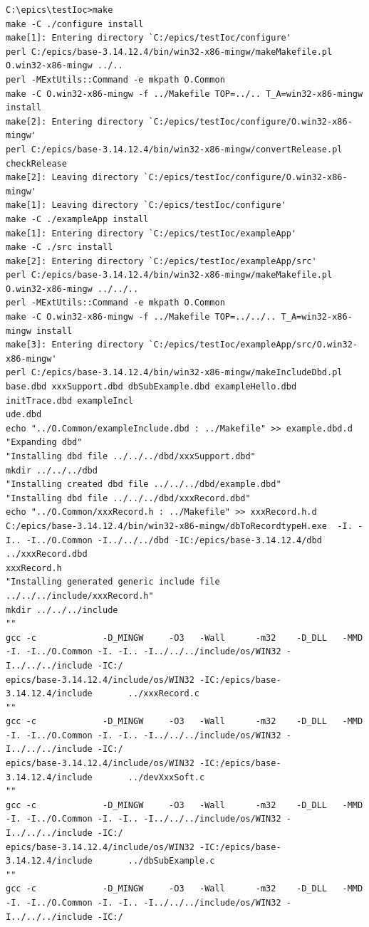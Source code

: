 \documentclass[11pt
  , a4paper
  , article
  , oneside
]{memoir}
\begin{document}
\begin{lstlisting}[style=termstyle]
C:\epics\testIoc>make
make -C ./configure install
make[1]: Entering directory `C:/epics/testIoc/configure'
perl C:/epics/base-3.14.12.4/bin/win32-x86-mingw/makeMakefile.pl O.win32-x86-mingw ../..
perl -MExtUtils::Command -e mkpath O.Common
make -C O.win32-x86-mingw -f ../Makefile TOP=../.. T_A=win32-x86-mingw install
make[2]: Entering directory `C:/epics/testIoc/configure/O.win32-x86-mingw'
perl C:/epics/base-3.14.12.4/bin/win32-x86-mingw/convertRelease.pl checkRelease
make[2]: Leaving directory `C:/epics/testIoc/configure/O.win32-x86-mingw'
make[1]: Leaving directory `C:/epics/testIoc/configure'
make -C ./exampleApp install
make[1]: Entering directory `C:/epics/testIoc/exampleApp'
make -C ./src install
make[2]: Entering directory `C:/epics/testIoc/exampleApp/src'
perl C:/epics/base-3.14.12.4/bin/win32-x86-mingw/makeMakefile.pl O.win32-x86-mingw ../../..
perl -MExtUtils::Command -e mkpath O.Common
make -C O.win32-x86-mingw -f ../Makefile TOP=../../.. T_A=win32-x86-mingw install
make[3]: Entering directory `C:/epics/testIoc/exampleApp/src/O.win32-x86-mingw'
perl C:/epics/base-3.14.12.4/bin/win32-x86-mingw/makeIncludeDbd.pl base.dbd xxxSupport.dbd dbSubExample.dbd exampleHello.dbd initTrace.dbd exampleIncl
ude.dbd
echo "../O.Common/exampleInclude.dbd : ../Makefile" >> example.dbd.d
"Expanding dbd"
"Installing dbd file ../../../dbd/xxxSupport.dbd"
mkdir ../../../dbd
"Installing created dbd file ../../../dbd/example.dbd"
"Installing dbd file ../../../dbd/xxxRecord.dbd"
echo "../O.Common/xxxRecord.h : ../Makefile" >> xxxRecord.h.d
C:/epics/base-3.14.12.4/bin/win32-x86-mingw/dbToRecordtypeH.exe  -I. -I.. -I../O.Common -I../../../dbd -IC:/epics/base-3.14.12.4/dbd ../xxxRecord.dbd
xxxRecord.h
"Installing generated generic include file ../../../include/xxxRecord.h"
mkdir ../../../include
""
gcc -c             -D_MINGW     -O3   -Wall      -m32    -D_DLL   -MMD -I. -I../O.Common -I. -I.. -I../../../include/os/WIN32 -I../../../include -IC:/
epics/base-3.14.12.4/include/os/WIN32 -IC:/epics/base-3.14.12.4/include       ../xxxRecord.c
""
gcc -c             -D_MINGW     -O3   -Wall      -m32    -D_DLL   -MMD -I. -I../O.Common -I. -I.. -I../../../include/os/WIN32 -I../../../include -IC:/
epics/base-3.14.12.4/include/os/WIN32 -IC:/epics/base-3.14.12.4/include       ../devXxxSoft.c
""
gcc -c             -D_MINGW     -O3   -Wall      -m32    -D_DLL   -MMD -I. -I../O.Common -I. -I.. -I../../../include/os/WIN32 -I../../../include -IC:/
epics/base-3.14.12.4/include/os/WIN32 -IC:/epics/base-3.14.12.4/include       ../dbSubExample.c
""
gcc -c             -D_MINGW     -O3   -Wall      -m32    -D_DLL   -MMD -I. -I../O.Common -I. -I.. -I../../../include/os/WIN32 -I../../../include -IC:/

\end{lstlisting}
\end{document}
